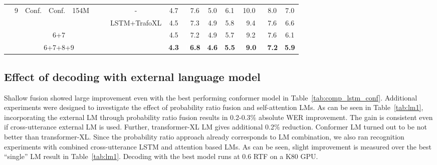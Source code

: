 \documentclass[a4paper]{article}
\begin{document}
\begin{table*}
\begin{tabular}{|@{}c@{}|@{}c@{}|@{}c@{}|@{}c@{}|@{}c@{}|@{}c@{}|@{}c@{}||@{}c@{}||c|c||c|@{}c@{}|@{}c@{}||c|c|}
        & \multirow{2}{*}{9} & \multirow{2}{*}{Conf.} & \multirow{2}{*}{Conf.} & \multirow{2}{*}{154M} &             &              &      -        & 4.7 & \textcolor{white}{0}7.6 & 5.0 & 6.1 & 10.0 & \textcolor{white}{0}8.0  & 7.0 \\ \cline{8-15}
        & \hspace{5mm} &        &            &         &             &              & \multirow{3}{*}{LSTM+TrafoXL} & 4.5 & \textcolor{white}{0}7.3 & 4.9 & 5.8 & \textcolor{white}{0}9.4 & \textcolor{white}{0}7.6  & 6.6 \\ \cline{2-7}\cline{9-15}
        & \multicolumn{6}{c||}{6+7}                                                                  &               & 4.5 & \textcolor{white}{0}7.2 & 4.9 & 5.7 & \textcolor{white}{0}9.2  &  \textcolor{white}{0}7.6 & 6.1 \\ \cline{2-7}\cline{9-15}
        & \multicolumn{6}{c||}{6+7+8+9}   &                                                                          & \bf 4.3 & \bf \textcolor{white}{0}6.8 & \bf 4.6 & \bf 5.5 & \bf \textcolor{white}{0}9.0 &  \bf \textcolor{white}{0}7.2 & \bf 5.9 \\
\hline
\end{tabular}                              
\label{tab:lm2}
\vspace{-4.5mm}
\end{table*}

\vspace{-1mm}
\subsection{Effect of decoding with external language model}
\vspace{-1mm}
Shallow fusion showed large improvement even with the best performing conformer model in Table~\ref{tab:comp_lstm_conf}.
Additional experiments were designed to investigate the effect of probability ratio fusion and self-attention LMs.
As can be seen in Table~\ref{tab:lm1}, incorporating the external LM through probability ratio fusion results in 0.2-0.3\% absolute WER improvement.
The gain is consistent even if cross-utterance external LM is used.
Further, transformer-XL LM gives additional 0.2\% reduction.
Conformer LM turned out to be not better than transformer-XL.
Since the probability ratio approach already corresponds to LM combination, we also ran recognition experiments with combined cross-utterance LSTM and attention based LMs.
As can be seen, slight improvement is measured over the best ``single'' LM result in Table~\ref{tab:lm1}.
Decoding with the best model runs at 0.6 RTF on a K80 GPU.
\end{document}

